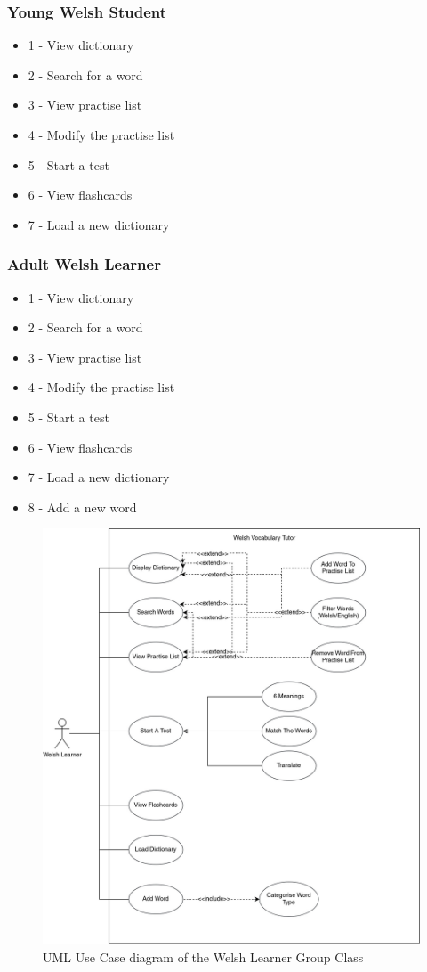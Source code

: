 \documentclass{project}
\begin{document}
\subsubsection{Young Welsh Student}
\begin{itemize}
	\item 1 - View dictionary 
	\item 2 - Search for a word
	\item 3 - View practise list
	\item 4 - Modify the practise list
	\item 5 - Start a test
	\item 6 - View flashcards
	\item 7 - Load a new dictionary
\end{itemize}

\subsubsection{Adult Welsh Learner}
\begin{itemize}
	\item 1 - View dictionary
	\item 2 - Search for a word
	\item 3 - View practise list
	\item 4 - Modify the practise list
	\item 5 - Start a test
	\item 6 - View flashcards
	\item 7 - Load a new dictionary
	\item 8 - Add a new word
\end{itemize}
\begin{figure}[h]
\includegraphics[width=\textwidth]{UCD}
\centering
	\caption{UML Use Case diagram of the Welsh Learner Group Class}
        \label{figure:1}
\end{figure}
\clearpage
\end{document}
